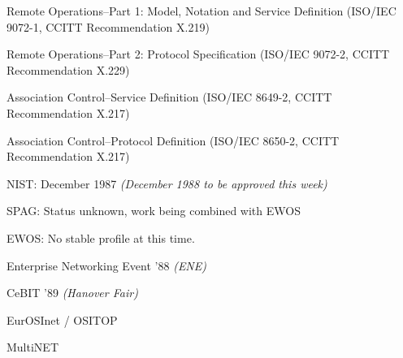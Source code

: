 \begin{bwslide}

\begin{nrtc}
\item {Remote Operations--Part 1: Model, Notation and Service Definition} (ISO/IEC 9072-1, CCITT Recommendation X.219)
\item {Remote Operations--Part 2: Protocol Specification} (ISO/IEC 9072-2, CCITT Recommendation X.229)
\end{nrtc}
\end{bwslide}

\begin{bwslide}

\begin{nrtc}
\item {Association Control--Service Definition} (ISO/IEC 8649-2, CCITT Recommendation X.217)
\item {Association Control--Protocol Definition} (ISO/IEC 8650-2, CCITT Recommendation X.217)
\end{nrtc}
\end{bwslide}

\begin{bwslide}

\begin{nrtc}
\item	NIST:  December 1987 {\em (December 1988 to be approved this week)}
\item	SPAG:  Status unknown, work being combined with EWOS
\item	EWOS:  No stable profile at this time.
\end{nrtc}
\end{bwslide}

\begin{bwslide}

\begin{nrtc}
\item	Enterprise Networking Event '88 {\em (ENE)}
\item	CeBIT '89 {\em (Hanover Fair)}
	\begin{nrtc}
	\item EurOSInet / OSITOP
	\item MultiNET
	\end{nrtc}
\end{nrtc}
\end{bwslide}

